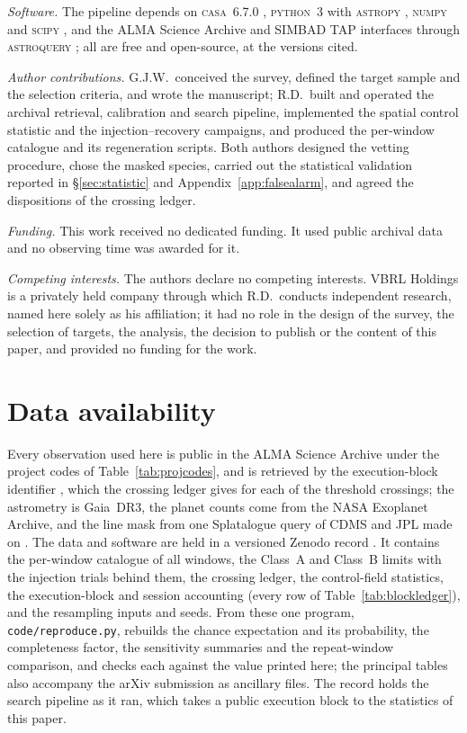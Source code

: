 \emph{Software.} The pipeline depends on \textsc{casa}~6.7.0
\citep{CASA2022}, \textsc{python}~3 with \textsc{astropy} \citep{Astropy2022}, \textsc{numpy}
\citep{Harris2020} and \textsc{scipy} \citep{Virtanen2020}, and the ALMA Science
Archive and SIMBAD TAP interfaces through \textsc{astroquery} \citep{Ginsburg2019};
all are free and open-source, at the versions cited.

\emph{Author contributions.} G.J.W.\ conceived the survey, defined the target
sample and the selection criteria, and wrote the manuscript; R.D.\ built and
operated the archival retrieval, calibration and search pipeline, implemented
the spatial control statistic and the injection--recovery campaigns, and
produced the per-window catalogue and its regeneration scripts. Both authors
designed the vetting procedure, chose the masked species, carried out the
statistical validation reported in \S\ref{sec:statistic} and
Appendix~\ref{app:falsealarm}, and agreed the dispositions of the crossing
ledger.

\emph{Funding.} This work received no dedicated funding. It used public archival data and
no observing time was awarded for it.

\emph{Competing interests.} The authors declare no competing interests. VBRL Holdings is a privately
held company through which R.D.\ conducts independent research, named
here solely as his affiliation; it had no role in the design of the
survey, the selection of targets, the analysis, the decision to publish
or the content of this paper, and provided no funding for the work.

\section*{Data availability}
\label{sec:data}
Every observation used here is public in the ALMA Science Archive under the
\NProjCodes{} project codes of Table~\ref{tab:projcodes}, and is retrieved by
the execution-block identifier \citep{Chen2022}, which the crossing ledger
gives for each of the \EvNCrossRaw{} threshold crossings; the astrometry is
Gaia~DR3, the planet counts come from the NASA Exoplanet Archive, and the line
mask from one Splatalogue query of CDMS and JPL made on \McQueryDate. The data
and software are held in a versioned Zenodo record \citep{SIdeposit}. It
contains the per-window catalogue of all \NWindows{} windows, the Class~A and
Class~B limits with the injection trials behind them, the crossing ledger, the
control-field statistics, the execution-block and session accounting (every
row of Table~\ref{tab:blockledger}), and the
resampling inputs and seeds. From these one program,
\texttt{code/reproduce.py}, rebuilds the chance expectation and its
probability, the completeness factor, the sensitivity summaries and the
repeat-window comparison, and checks each against the value printed here; the
principal tables also accompany the arXiv submission as ancillary files. The
record holds the search pipeline as it ran, which takes a public execution
block to the statistics of this paper.

